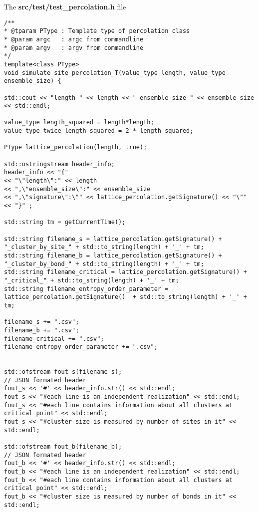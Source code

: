 
The \textbf{src/test/test\_percolation.h} file

\begin{lstlisting}[style=CStyle]
/**
* @tparam PType : Template type of percolation class
* @param argc   : argc from commandline
* @param argv   : argv from commandline
*/
template<class PType>
void simulate_site_percolation_T(value_type length, value_type ensemble_size) {

std::cout << "length " << length << " ensemble_size " << ensemble_size << std::endl;

value_type length_squared = length*length;
value_type twice_length_squared = 2 * length_squared;

PType lattice_percolation(length, true);

std::ostringstream header_info;
header_info << "{"
<< "\"length\":" << length
<< ",\"ensemble_size\":" << ensemble_size
<< ",\"signature\":\"" << lattice_percolation.getSignature() << "\""
<< "}" ;

std::string tm = getCurrentTime();

std::string filename_s = lattice_percolation.getSignature() + "_cluster_by_site_" + std::to_string(length) + '_' + tm;
std::string filename_b = lattice_percolation.getSignature() + "_cluster_by_bond_" + std::to_string(length) + '_' + tm;
std::string filename_critical = lattice_percolation.getSignature() + "_critical_" + std::to_string(length) + '_' + tm;
std::string filename_entropy_order_parameter = lattice_percolation.getSignature()  + std::to_string(length) + '_' + tm;

filename_s += ".csv";
filename_b += ".csv";
filename_critical += ".csv";
filename_entropy_order_parameter += ".csv";


std::ofstream fout_s(filename_s);
// JSON formated header
fout_s << '#' << header_info.str() << std::endl;
fout_s << "#each line is an independent realization" << std::endl;
fout_s << "#each line contains information about all clusters at critical point" << std::endl;
fout_s << "#cluster size is measured by number of sites in it" << std::endl;

std::ofstream fout_b(filename_b);
// JSON formated header
fout_b << '#' << header_info.str() << std::endl;
fout_b << "#each line is an independent realization" << std::endl;
fout_b << "#each line contains information about all clusters at critical point" << std::endl;
fout_b << "#cluster size is measured by number of bonds in it" << std::endl;


\end{lstlisting}
